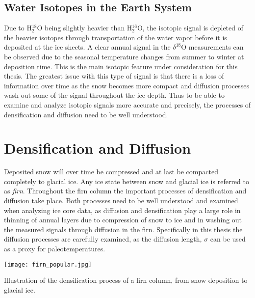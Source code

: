 \documentclass[../../CompleteThesis2/Complete_2ndDraft]{subfiles}
\begin{document}
\subsection[Relation to Temperature]{Water Isotopes in the Earth System}
\label{Subsec:Ice_WaterIsotopes_EarthSystem}
Due to H$_2^{18}$O being slightly heavier than H$_2^{16}$O, the isotopic signal is depleted of the heavier isotopes through transportation of the water vapor before it is deposited at the ice sheets. A clear annual signal in the $\delta^{18}$O measurements can be observed due to the seasonal temperature changes from summer to winter at deposition time. This is the main isotopic feature under consideration for this thesis. The greatest issue with this type of signal is that there is a loss of information over time as the snow becomes more compact and diffusion processes wash out some of the signal throughout the ice depth. Thus to be able to examine and analyze isotopic signals more accurate and precisely, the processes of densification and diffusion need to be well understood.



\section[Densification and Diffusion][Densification and Diffusion]{Densification and Diffusion}
\label{Sec:Ice_DensificationAndDiffusion}
Deposited snow will over time be compressed and at last be compacted completely to glacial ice. Any ice state between snow and glacial ice is referred to as \textit{firn}. Throughout the firn column the important processes of densification and diffusion take place. Both processes need to be well understood and examined when analyzing ice core data, as diffusion and densification play a large role in thinning of annual layers due to compression of snow to ice and in washing out the measured signals through diffusion in the firn. Specifically in this thesis the diffusion processes are carefully examined, as the diffusion length, $\sigma$ can be used as a proxy for paleotemperatures.

\begin{marginfigure}
	\centering
	\texttt{[image: firn\_popular.jpg]}
	\caption{Illustration of the densification process of a firn column, from snow deposition to glacial ice.}
	\label{Fig:ICE_DENS_FirnColumn}
\end{marginfigure}
\end{document}
